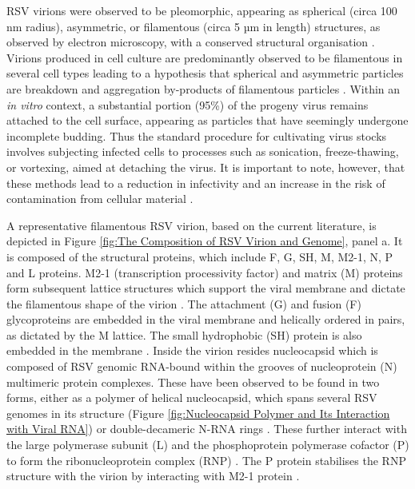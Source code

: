 RSV virions were observed to be pleomorphic, appearing as spherical (circa 100 nm radius), asymmetric, or filamentous (circa 5 µm in length) structures, as observed by electron microscopy, with a conserved structural organisation \cite{Kiss2014StructuralComplex}. Virions produced in cell culture are predominantly observed to be filamentous in several cell types leading to a hypothesis that spherical and asymmetric particles are breakdown and aggregation by-products of filamentous particles \cite{Ke2018TheTomography, Conley2022HelicalVirus}. Within an \textit{in vitro} context, a substantial portion (95\%) of the progeny virus remains attached to the cell surface, appearing as particles that have seemingly undergone incomplete budding. Thus the standard procedure for cultivating virus stocks involves subjecting infected cells to processes such as sonication, freeze-thawing, or vortexing, aimed at detaching the virus. It is important to note, however, that these methods lead to a reduction in infectivity and an increase in the risk of contamination from cellular material \cite{Collins2013RespiratoryDisease}.

A representative filamentous RSV virion, based on the current literature, is depicted in Figure \ref{fig:The Composition of RSV Virion and Genome}, panel a. It is composed of the structural proteins, which include F, G, SH, M, M2-1, N, P and L proteins. M2-1 (transcription processivity factor) and matrix (M) proteins form subsequent lattice structures which support the viral membrane and dictate the filamentous shape of the virion \cite{Conley2022HelicalVirus}. The attachment (G) and fusion (F) glycoproteins are embedded in the viral membrane and helically ordered in pairs, as dictated by the M lattice. The small hydrophobic (SH) protein is also embedded in the membrane \cite{Ke2018TheTomography, Conley2022HelicalVirus}. Inside the virion resides nucleocapsid which is composed of RSV genomic RNA-bound within the grooves of nucleoprotein (N) multimeric protein complexes. These have been observed to be found in two forms, either as a polymer of helical nucleocapsid, which spans several RSV genomes in its structure (Figure \ref{fig:Nucleocapsid Polymer and Its Interaction with Viral RNA}) \cite{Tawar2009CrystalVirus, Conley2022HelicalVirus} or double-decameric N-RNA rings \cite{Gonnin2023StructuralNucleocapsids, Gonnin2022ImportanceVirus, Conley2022HelicalVirus}. These further interact with the large polymerase subunit (L) and the phosphoprotein polymerase cofactor (P) to form the ribonucleoprotein complex (RNP) \cite{Gonnin2023StructuralNucleocapsids}. The P protein stabilises the RNP structure with the virion by interacting with M2-1 protein \cite{Mason2003InteractionActivity}.

